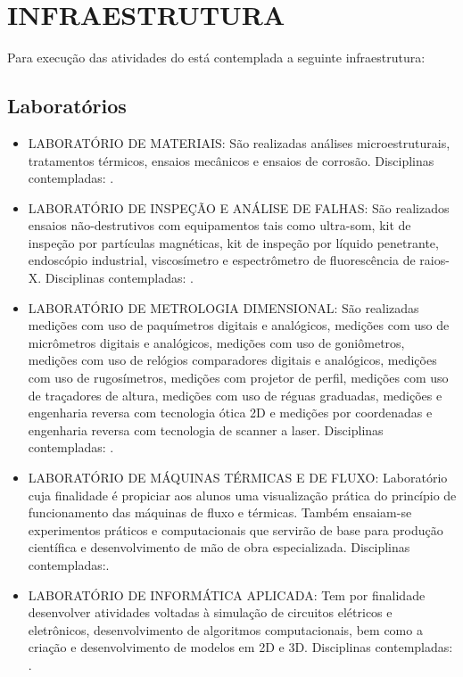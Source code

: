 \documentclass{paper}
\begin{document}

\clearpage
\section{INFRAESTRUTURA}
\label{INFRA}
Para execução das atividades do \NOMECURSO está contemplada a seguinte infraestrutura:

\subsection{Laboratórios}

\begin{itemize}%
\item [LMAT] LABORATÓRIO DE MATERIAIS: São realizadas análises microestruturais, tratamentos térmicos, ensaios mecânicos e ensaios de
corrosão. Disciplinas contempladas: \LMATdisc.

\item [LIAF] LABORATÓRIO DE INSPEÇÃO E ANÁLISE DE FALHAS: São realizados ensaios não-destrutivos com equipamentos tais como
ultra-som, kit de inspeção por partículas magnéticas, kit de inspeção por líquido penetrante, endoscópio industrial,
viscosímetro e espectrômetro de fluorescência de raios-X. Disciplinas contempladas: \LIAFdisc.

\item [LMET] LABORATÓRIO DE METROLOGIA DIMENSIONAL: São realizadas medições com uso de paquímetros digitais e analógicos, medições
com uso de micrômetros digitais e analógicos, medições com uso de goniômetros, medições com uso de relógios
comparadores digitais e analógicos, medições com uso de rugosímetros, medições com projetor de perfil, medições com uso
de traçadores de altura, medições com uso de réguas graduadas, medições e engenharia reversa com tecnologia ótica 2D e
medições por coordenadas e engenharia reversa com tecnologia de scanner a laser.  Disciplinas contempladas: \LMETdisc.

\item [LTF] LABORATÓRIO DE MÁQUINAS TÉRMICAS E DE FLUXO: Laboratório cuja finalidade é propiciar aos alunos uma visualização prática
do princípio de funcionamento das máquinas de fluxo e térmicas. Também ensaiam-se experimentos práticos e
computacionais que servirão de base para produção científica e desenvolvimento de mão de obra especializada. Disciplinas contempladas:\LTFdisc.

\item [LIA] LABORATÓRIO DE INFORMÁTICA APLICADA: Tem por finalidade desenvolver atividades voltadas à simulação de circuitos
elétricos e eletrônicos, desenvolvimento de algoritmos computacionais, bem como a criação e desenvolvimento de modelos
em 2D e 3D. Disciplinas contempladas: \LIAdisc.


\end{itemize}
\end{document}
